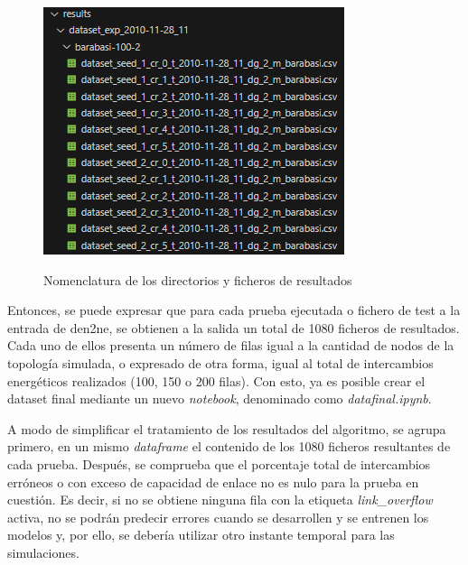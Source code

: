 \begin{figure}[h!]
\begin{minipage}{0.6\textwidth}
      \includegraphics[width=\linewidth]{img/diseno/dirpruebas.png}
      \label{fig:dirpruebas}
    \end{minipage}\hfill
    \caption{Nomenclatura de los directorios y ficheros de resultados}
    \label{fig:dirnombres}
\end{figure}

\pagebreak

Entonces, se puede expresar que para cada prueba ejecutada o fichero de test a la entrada de \gls{den2ne}, se obtienen a la salida un total de 1080 ficheros de resultados. Cada uno de ellos presenta un número de filas igual a la cantidad de nodos de la topología simulada, o expresado de otra forma, igual al total de intercambios energéticos realizados (100, 150 o 200 filas). Con esto, ya es posible crear el dataset final mediante un nuevo \textit{notebook}, denominado como \textit{datafinal.ipynb}. 

\vspace{3mm}

A modo de simplificar el tratamiento de los resultados del algoritmo, se agrupa primero, en un mismo \textit{dataframe} el contenido de los 1080 ficheros resultantes de cada prueba. Después, se comprueba que el porcentaje total de intercambios erróneos o con exceso de capacidad de enlace no es nulo para la prueba en cuestión. Es decir, si no se obtiene ninguna fila con la etiqueta \textit{link\_overflow} activa, no se podrán predecir errores cuando se desarrollen y se entrenen los modelos y, por ello, se debería utilizar otro instante temporal para las simulaciones. 


